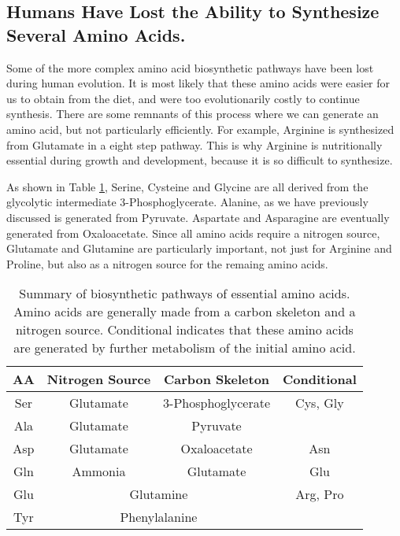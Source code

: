\documentclass{tufte-handout}
\begin{document}
\subsection{Humans Have Lost the Ability to Synthesize Several Amino Acids.}  Some of the more complex amino acid biosynthetic pathways have been lost during human evolution.  It is most likely that these amino acids were  easier for us to obtain from the diet, and were too evolutionarily costly to continue synthesis.  There are some remnants of this process where we can generate an amino acid, but not particularly efficiently.   For example, Arginine is synthesized from Glutamate in a eight step pathway.  This is why Arginine is nutritionally essential during growth and development, because it is so difficult to synthesize.

  As shown in Table \ref{tab:aa-biosynthesis-summary}, Serine, Cysteine and Glycine are all derived from the glycolytic intermediate 3-Phosphoglycerate.  Alanine, as we have previously discussed is generated from Pyruvate.  Aspartate and Asparagine are eventually generated from Oxaloacetate.  Since all amino acids require a nitrogen source, Glutamate and Glutamine are particularly important, not just for Arginine and Proline, but also as a nitrogen source for the remaing amino acids. 

\begin{table}[h]
\centering
\caption{Summary of biosynthetic pathways of essential amino acids.  Amino acids are generally made from a carbon skeleton and a nitrogen source.  Conditional indicates that these amino acids are generated by further metabolism of the initial amino acid.}
\label{tab:aa-biosynthesis-summary}
\begin{tabular}{|c|c|c|c|}
\hline
AA        & Nitrogen Source  & Carbon Skeleton & Conditional      \\ \hline
Ser    & Glutamate                            & 3-Phosphoglycerate                                 & Cys, Gly            \\ \hline
Ala   & Glutamate                            & Pyruvate                             &                              \\ \hline
Asp & Glutamate                         & Oxaloacetate                        & Asn                   \\ \hline
Gln & Ammonia                              & Glutamate                            &   Glu                           \\ \hline
Glu & \multicolumn{2}{c|}{Glutamine}                                              & Arg, Pro \\ \hline
Tyr  & \multicolumn{2}{c|}{Phenylalanine}                                          &                              \\ \hline
\end{tabular}
\end{table}
\end{document}
